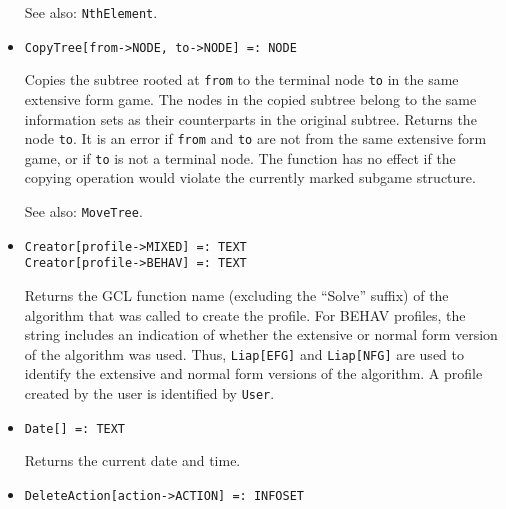\begin{itemize}
{\it for all types} {\tt T}
\bd
Returns \verb+True+ when the value \verb+x+ is contained in \verb+list+.
\item [See also:] \verb+NthElement+.
\ed

\item{}
\protect \large \begin{verbatim}
CopyTree[from->NODE, to->NODE] =: NODE 
\end{verbatim}\normalsize

\bd
Copies the subtree rooted at \verb+from+ to the terminal
node \verb+to+ in the same extensive form game.  The nodes in the
copied subtree belong to the same information sets as their counterparts in
the original subtree.  Returns the node \verb+to+.  It is an error if
\verb+from+ and \verb+to+ are not from the same extensive form game,
or if \verb+to+ is not a terminal node.  The function has no effect if
the copying operation would violate the currently marked subgame
structure.

\item
[See also:] \verb+MoveTree+.
\ed

\item{}
\protect \large \begin{verbatim}
Creator[profile->MIXED] =: TEXT
Creator[profile->BEHAV] =: TEXT
\end{verbatim}\normalsize

\bd 
Returns the GCL function name (excluding the ``Solve'' suffix) of
the algorithm that was called to create the profile. For
BEHAV profiles, the string includes an indication of whether the
extensive or normal form version of the algorithm was used.  Thus,
\verb+Liap[EFG]+ and \verb+Liap[NFG]+ are used to identify the
extensive and normal form versions of the algorithm.  A profile
created by the user is identified by \verb+User+.  
\ed


\item{}
\protect \large \begin{verbatim}
Date[] =: TEXT 
\end{verbatim}\normalsize

\bd
Returns the current date and time. 
\ed

\item{}
\protect \large \begin{verbatim}
DeleteAction[action->ACTION] =: INFOSET 
\end{verbatim}\normalsize


\end{itemize}
